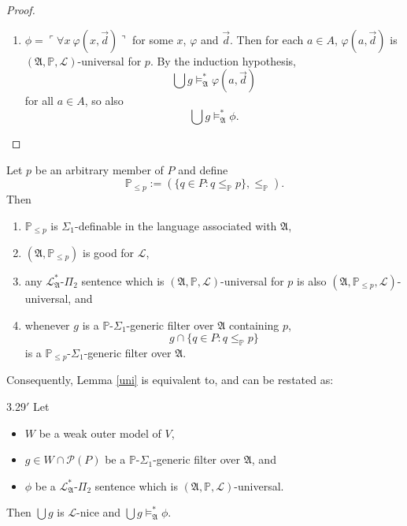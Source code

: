 \documentclass[12pt]{article}
\numberwithin{equation}{section}
\begin{document}
\begin{proof}
\begin{enumerate}[label=Case \arabic*:, leftmargin=50pt]
    \item $\phi = \ulcorner \forall x \ \varphi(x, \Vec{d}) \urcorner$ for some $x$, $\varphi$ and $\Vec{d}$. Then for each $a \in A$, $\varphi(a, \Vec{d})$ is $(\mathfrak{A}, \mathbb{P}, \mathcal{L})$-universal for $p$. By the induction hypothesis, $$\bigcup g \models^{*}_{\mathfrak{A}} \varphi(a, \Vec{d})$$ for all $a \in A$, so also $$\bigcup g \models^{*}_{\mathfrak{A}} \phi.$$ \qedhere
\end{enumerate}
\end{proof}

\begin{rem}\label{endremmain}
Let $p$ be an arbitrary member of $P$ and define $$\mathbb{P}_{\leq p} := (\{q \in P : q \leq_{\mathbb{P}} p\}, \leq_{\mathbb{P}}).$$ Then 
\begin{enumerate}[label=(\arabic*)]
    \item $\mathbb{P}_{\leq p}$ is $\Sigma_1$-definable in the language associated with $\mathfrak{A}$, 
    \item $(\mathfrak{A}, \mathbb{P}_{\leq p})$ is good for $\mathcal{L}$, 
    \item any $\mathcal{L}^{*}_{\mathfrak{A}}$-$\Pi_2$ sentence which is $(\mathfrak{A}, \mathbb{P}, \mathcal{L})$-universal for $p$ is also $(\mathfrak{A}, \mathbb{P}_{\leq p}, \mathcal{L})$-universal, and
    \item whenever $g$ is a $\mathbb{P}$-$\Sigma_1$-generic filter over $\mathfrak{A}$ containing $p$, $$g \cap \{q \in P : q \leq_{\mathbb{P}} p\}$$ is a $\mathbb{P}_{\leq p}$-$\Sigma_1$-generic filter over $\mathfrak{A}$.
\end{enumerate}
Consequently, Lemma \ref{uni} is equivalent to, and can be restated as:
\begin{customlem}{3.29$'$}
Let 
\begin{itemize} 
    \item $W$ be a weak outer model of $V$,
    \item $g \in W \cap \mathcal{P}(P)$ be a $\mathbb{P}$-$\Sigma_1$-generic filter over $\mathfrak{A}$, and
    \item $\phi$ be a $\mathcal{L}^{*}_{\mathfrak{A}}$-$\Pi_2$ sentence which is $(\mathfrak{A}, \mathbb{P}, \mathcal{L})$-universal.
\end{itemize} 
Then $\bigcup g$ is $\mathcal{L}$-nice and $\bigcup g \models^{*}_{\mathfrak{A}} \phi$.
\end{customlem}
\end{rem}
\end{document}
